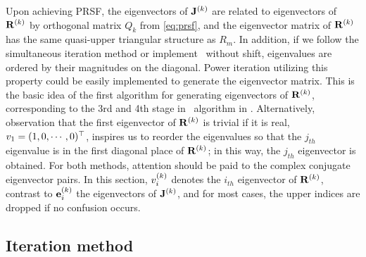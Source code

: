 \documentclass[final,leqno,onefignum,onetabnum]{siamltexmm}
\begin{document}
Upon achieving PRSF,
the eigenvectors of $\ps{\jMps}{k}$ are related to eigenvectors of
$\ps{R}{k}$ by orthogonal matrix $Q_{k}$ from \eqref{eq:prsf}, and
the
eigenvector matrix of $\ps{R}{k}$ has the same quasi-upper triangular
structure as $R_m$. In addition, if we follow the
simultaneous iteration method or
implement \psd\ without shift, eigenvalues are ordered by their
magnitudes on the diagonal. Power iteration utilizing this property
could be easily implemented to generate the eigenvector
matrix. This is the basic idea of the first algorithm for generating
eigenvectors of $\ps{R}{k}$, corresponding to the 3rd and 4th stage in
{\cLv\ algorithm} in .
Alternatively,
observation that
the first eigenvector of $\ps{R}{k}$ is trivial if it is real,
$\Rve{1}=(1,0,\cdots,0)^\top $, inspires us to reorder the
eigenvalues so that the $j_{th}$ eigenvalue is in the first diagonal
place of $\ps{R}{k}$; in this way, the $j_{th}$ eigenvector is obtained.
For both methods, attention should be paid to the complex conjugate
eigenvector pairs. In this section, $\Rve{i}^{(k)}$
denotes the $i_{th}$ eigenvector of $\ps{R}{k}$, contrast to
$\jEigvec[i]^{(k)}$
the eigenvectors of $\ps{J}{k}$, and for most cases, the upper indices
are dropped if no confusion occurs.

\subsection{Iteration method}
\end{document}
